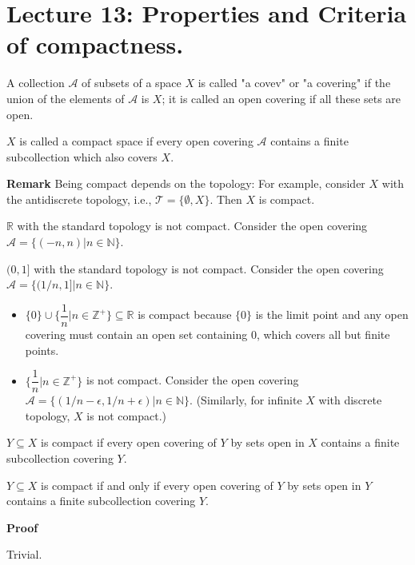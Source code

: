\documentclass[main.tex]{subfiles}
\begin{document}
\pagestyle{plain}
\setcounter{chapter}{12}

\chapter{Lecture 13: Properties and Criteria of compactness. }
\label{chap:chapter13}

\begin{definition}
    A collection $\mathcal{A}$ of subsets of a space $X$ is called "a covev" or "a covering" if the union of the elements of $\mathcal{A}$ is $X$; it is called an open covering if all these sets are open. 
\end{definition}

\begin{definition}
    $X$ is called a compact space if every open covering $\mathcal{A}$ contains a finite subcollection which also covers $X$. 
\end{definition}
\par \noindent \textbf{Remark} Being compact depends on the topology: For example, consider $X$ with the antidiscrete topology, i.e., $\mathcal{T} = \{\emptyset, X\}$. Then $X$ is compact. 
\begin{example}
    $\mathbb{R}$ with the standard topology is not compact. Consider the open covering $\mathcal{A} = \{(-n, n) | n \in \mathbb{N}\}$. 
\end{example}
\begin{example}
    $(0, 1]$ with the standard topology is not compact. Consider the open covering $\mathcal{A} = \{(1/n, 1] | n \in \mathbb{N}\}$.
\end{example}
\begin{example}
    \begin{itemize}
        \item $\{0\}\cup \{\dfrac{1}{n}| n\in \mathbb{Z}^{+}\} \subseteq \mathbb{R}$ is compact because $\{0\}$ is the limit point and any open covering must contain an open set containing $0$, which covers all but finite points.
        \item $\{\dfrac{1}{n}| n\in \mathbb{Z}^+\}$ is not compact. Consider the open covering $\mathcal{A} = \{(1/n - \epsilon, 1/n + \epsilon) | n \in \mathbb{N}\}$. (Similarly, for infinite $X$ with discrete topology, $X$ is not compact.)
    \end{itemize}
\end{example}

\begin{definition}
    $Y \subseteq X$ is compact if every open covering of $Y$ by sets open in $X$ contains a finite subcollection covering $Y$.
\end{definition}
\begin{lemma}
    $Y \subseteq X$ is compact if and only if every open covering of $Y$ by sets open in $Y$ contains a finite subcollection covering $Y$.
\end{lemma}
\par \noindent \textbf{Proof}
\par Trivial. 
\end{document}
